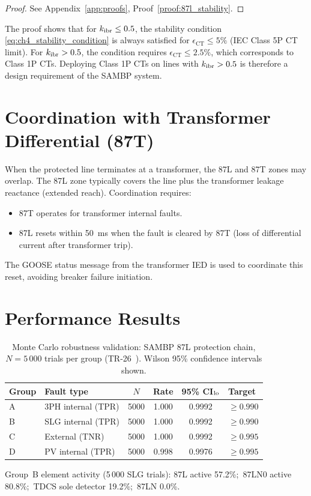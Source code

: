 \begin{proof}
See Appendix~\ref{app:proofs}, Proof~\ref{proof:87l_stability}.
\end{proof}

The proof shows that for $k_{\mathrm{ibr}} \leq 0.5$, the stability condition
\eqref{eq:ch4_stability_condition} is always satisfied for
$\epsilon_\mathrm{CT} \leq 5\%$ (IEC Class 5P CT limit). For
$k_{\mathrm{ibr}} > 0.5$, the condition requires $\epsilon_\mathrm{CT} \leq 2.5\%$,
which corresponds to Class 1P CTs. Deploying Class 1P CTs on lines with
$k_{\mathrm{ibr}} > 0.5$ is therefore a design requirement of the SAMBP system.

\section{Coordination with Transformer Differential (87T)}
\label{sec:ch4_87t_coord}

When the protected line terminates at a transformer, the 87L and 87T zones
may overlap. The 87L zone typically covers the line plus the transformer
leakage reactance (extended reach). Coordination requires:
\begin{itemize}
\item 87T operates for transformer internal faults.
\item 87L resets within 50~ms when the fault is cleared by 87T
  (loss of differential current after transformer trip).
\end{itemize}
The GOOSE status message from the transformer IED is used to coordinate
this reset, avoiding breaker failure initiation.

\section{Performance Results}
\label{sec:ch4_results}

\begin{table}[htbp]
\centering
\caption{Monte Carlo robustness validation: SAMBP 87L protection chain,
         $N = 5\,000$ trials per group (TR-26~\cite{SAMBP_TR26}).
         Wilson 95\% confidence intervals shown.}
\label{tab:ch4_mc_aggregate}
\renewcommand{\arraystretch}{1.08}
\begin{tabularx}{\textwidth}{@{}lXcccl@{}}
\toprule
Group & Fault type & $N$ & Rate & 95\% CI$_{\rm lo}$ & Target \\
\midrule
A & 3PH internal (TPR) & 5000 & 1.000 & 0.9992 & $\geq 0.990$ \\
B & SLG internal (TPR) & 5000 & 1.000 & 0.9992 & $\geq 0.990$ \\
C & External (TNR)     & 5000 & 1.000 & 0.9992 & $\geq 0.995$ \\
D & PV internal (TPR)  & 5000 & 0.998 & 0.9976 & $\geq 0.995$ \\
\bottomrule
\end{tabularx}
\smallskip\noindent\footnotesize
Group~B element activity (5\,000 SLG trials):
87L active 57.2\%;\ 87LN0 active 80.8\%;\ TDCS sole detector 19.2\%;\ 87LN 0.0\%.
\end{table}

